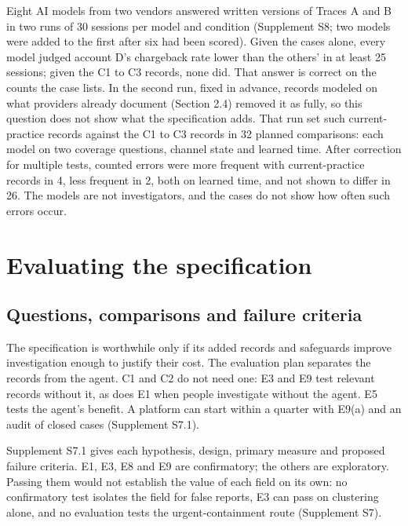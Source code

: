 \documentclass[acmlarge,nonacm]{acmart}
\begin{document}
Eight AI models from two vendors answered written versions of Traces A
and B in two runs of 30 sessions per model and condition (Supplement S8;
two models were added to the first after six had been scored). Given the
cases alone, every model judged account D's chargeback rate lower than
the others' in at least 25 sessions; given the C1 to C3 records, none
did. That answer is correct on the counts the case lists. In the second
run, fixed in advance, records modeled on what providers already
document (Section 2.4) removed it as fully, so this question does not
show what the specification adds. That run set such current-practice
records against the C1 to C3 records in 32 planned comparisons: each
model on two coverage questions, channel state and learned time. After
correction for multiple tests, counted errors were more frequent with
current-practice records in 4, less frequent in 2, both on learned time,
and not shown to differ in 26. The models are not investigators, and the
cases do not show how often such errors occur.

\hypertarget{evaluating-the-specification}{%
\section{Evaluating the
specification}\label{evaluating-the-specification}}

\hypertarget{questions-comparisons-and-failure-criteria}{%
\subsection{Questions, comparisons and failure
criteria}\label{questions-comparisons-and-failure-criteria}}

The specification is worthwhile only if its added records and safeguards
improve investigation enough to justify their cost. The evaluation plan
separates the records from the agent. C1 and C2 do not need one: E3 and
E9 test relevant records without it, as does E1 when people investigate
without the agent. E5 tests the agent's benefit. A platform can start
within a quarter with E9(a) and an audit of closed cases (Supplement
S7.1).

Supplement S7.1 gives each hypothesis, design, primary measure and
proposed failure criteria. E1, E3, E8 and E9 are confirmatory; the
others are exploratory. Passing them would not establish the value of
each field on its own: no confirmatory test isolates the field for false
reports, E3 can pass on clustering alone, and no evaluation tests the
urgent-containment route (Supplement S7).
\end{document}
